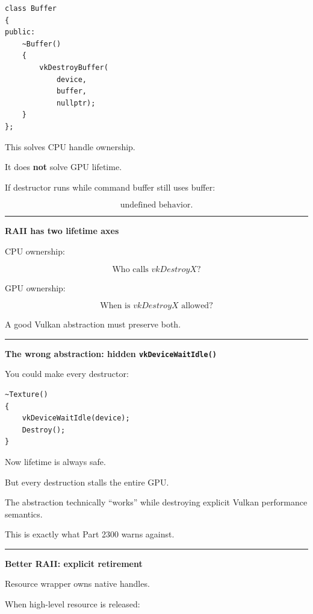 \begin{verbatim}
class Buffer
{
public:
    ~Buffer()
    {
        vkDestroyBuffer(
            device,
            buffer,
            nullptr);
    }
};
\end{verbatim}

This solves CPU handle ownership.

It does \textbf{not} solve GPU lifetime.

If destructor runs while command buffer still uses buffer:

\[
\boxed{\text{undefined behavior}.}
\]

\begin{center}\rule{0.5\linewidth}{0.5pt}\end{center}

\textbf{RAII has two lifetime axes}

CPU ownership:

\[
\boxed{
\text{Who calls }vkDestroyX?
}
\]

GPU ownership:

\[
\boxed{
\text{When is }vkDestroyX\text{ allowed?}
}
\]

A good Vulkan abstraction must preserve both.

\begin{center}\rule{0.5\linewidth}{0.5pt}\end{center}

\textbf{The wrong abstraction: hidden \texttt{vkDeviceWaitIdle()}}

You could make every destructor:

\begin{verbatim}
~Texture()
{
    vkDeviceWaitIdle(device);
    Destroy();
}
\end{verbatim}

Now lifetime is always safe.

But every destruction stalls the entire GPU.

The abstraction technically ``works'' while destroying explicit Vulkan performance semantics.

This is exactly what Part 2300 warns against.

\begin{center}\rule{0.5\linewidth}{0.5pt}\end{center}

\textbf{Better RAII: explicit retirement}

Resource wrapper owns native handles.

When high-level resource is released:

